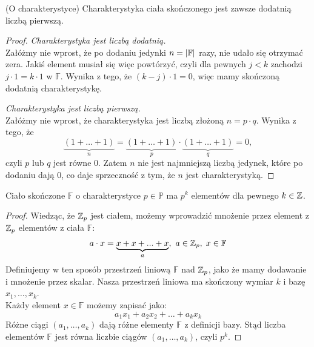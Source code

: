 \begin{theorem}(O charakterystyce)
Charakterystyka ciała skończonego jest zawsze dodatnią liczbą pierwszą.
\end{theorem}
\begin{proof}
    \textit{Charakterystyka jest liczbą dodatnią.} \\
    Załóżmy nie wprost, że po dodaniu jedynki \( n = \left\lvert\mathbb{F}\right\rvert \) razy, nie udało się otrzymać zera. Jakiś element musiał się więc powtórzyć, czyli dla pewnych \( j < k \) zachodzi \( j \cdot 1 = k \cdot 1 \) w \( \mathbb{F} \).
    Wynika z tego, że \( (k - j) \cdot 1 = 0 \), więc mamy skończoną dodatnią charakterystykę.

    \textit{Charakterystyka jest liczbą pierwszą.} \\
    Załóżmy nie wprost, że charakterystyka jest liczbą złożoną \( n = p \cdot q \). Wynika z tego, że
    \[
        \underbrace{(1 + \dots + 1)}_n = \underbrace{(1 + \dots + 1)}_p \cdot \underbrace{(1 + \dots + 1)}_q = 0,
    \]
    czyli \( p \) lub \( q \) jest równe 0. Zatem \( n \) nie jest najmniejszą liczbą jedynek, które po dodaniu dają 0, co daje sprzeczność z tym, że \( n \) jest charakterystyką.
\end{proof}

\begin{theorem}
	Ciało skończone \( \mathbb{F} \)  o charakterystyce \( p \in \mathbb{P} \) ma \( p^k \) elementów dla pewnego \( k \in \mathbb{Z} \).
\end{theorem}
\begin{proof}
	Wiedząc, że \( \mathbb{Z}_p \) jest ciałem, możemy wprowadzić mnożenie przez element z \( \mathbb{Z}_p \) elementów z ciała \( \mathbb{F} \):
	\[
		a \cdot x = \underbrace{x + x + ... + x}_a, \ a \in \mathbb{Z}_p,\; x \in \mathbb{F}
	\]
	Definiujemy w ten sposób przestrzeń liniową \( \mathbb{F} \) nad \( \mathbb{Z}_p \), jako że mamy dodawanie i mnożenie przez skalar. Nasza przestrzeń liniowa ma skończony wymiar \( k \) i bazę \( x_1, \dots, x_k \). \\
	Każdy element \( x \in \mathbb{F} \) możemy zapisać jako:
	\[
		a_1x_1 + a_2x_2 + \dots + a_kx_k
	\]
	Różne ciągi \( (a_1, \dots, a_k) \) dają różne elementy \( \mathbb{F} \) z definicji bazy. Stąd liczba elementów \( \mathbb{F} \) jest równa liczbie ciągów \( (a_1, \dots, a_k) \), czyli \( p^k \).
\end{proof}